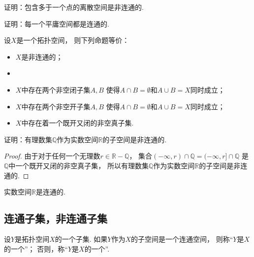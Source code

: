 \begin{example}
证明：包含多于一个点的离散空间是非连通的.
\end{example}

\begin{example}
证明：每一个平庸空间都是连通的.
\end{example}

\begin{theorem}
设\(X\)是一个拓扑空间，
则下列命题等价：\begin{itemize}
	\item \(X\)是非连通的；
	\item
	\item \(X\)中存在两个非空闭子集\(A,B\)
	使得\(A \cap B = \emptyset\)和\(A \cup B = X\)同时成立；

	\item \(X\)中存在两个非空开子集\(A,B\)
	使得\(A \cap B = \emptyset\)和\(A \cup B = X\)同时成立；

	\item \(X\)中存在着一个既开又闭的非空真子集.
\end{itemize}
\end{theorem}

\begin{example}
证明：有理数集\(\mathbb{Q}\)作为实数空间\(\mathbb{R}\)的子空间是非连通的.
\begin{proof}
由于对于任何一个无理数\(r \in \mathbb{R}-\mathbb{Q}\)，
集合\((-\infty,r)\cap\mathbb{Q}
= (-\infty,r]\cap\mathbb{Q}\)
是\(\mathbb{Q}\)中一个既开又闭的非空真子集，
所以有理数集\(\mathbb{Q}\)作为实数空间\(\mathbb{R}\)的子空间是非连通的.
\end{proof}
\end{example}

\begin{theorem}
实数空间\(\mathbb{R}\)是连通的.
\end{theorem}

\subsection{连通子集，非连通子集}
\begin{definition}
设\(Y\)是拓扑空间\(X\)的一个子集.
如果\(Y\)作为\(X\)的子空间是一个连通空间，
则称“\(Y\)是\(X\)的一个”；
否则，称“\(Y\)是\(X\)的一个”.
\end{definition}

